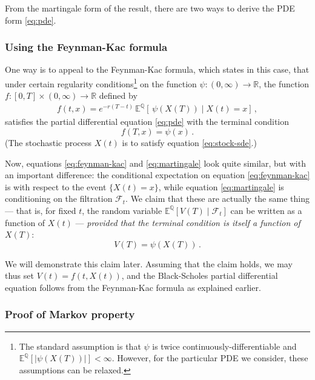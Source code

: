 \documentclass[12pt]{article}
\newcommand{\real}{\mathbb{R}}
\providecommand{\abs}[1]{\lvert#1\rvert}
\newcommand{\sF}{\mathcal{F}}
\newcommand{\EQ}{\mathbb{E}^\mathbb{Q}}
\begin{document}
From the martingale form of the result,
there are two ways to derive the PDE form \eqref{eq:pde}.

\subsubsection{Using the Feynman-Kac formula}

One way is to appeal to the Feynman-Kac formula,
which states in this case, that
under certain regularity conditions\footnote{
The standard assumption is that $\psi$ is twice continuously-differentiable
and $\EQ[ \abs{ \psi(X(T)) } ] < \infty$.
However, for the particular PDE we consider, 
these assumptions can be relaxed.}
on the
function $\psi \colon (0, \infty) \to \real$, the 
function $f \colon [0,T] \times (0, \infty) \to \real$ 
defined by
\begin{align}\label{eq:feynman-kac}
f(t, x) = e^{-r(T-t)} \, \EQ[ \, \psi(X(T)) \mid X(t) = x]\,,
\end{align}
satisfies the partial differential equation \eqref{eq:pde}
with the terminal condition
\[
f(T, x) = \psi(x)\,.
\]
(The stochastic process $X(t)$
is to satisfy equation \eqref{eq:stock-sde}.)

Now, equations \eqref{eq:feynman-kac} and \eqref{eq:martingale}
look quite similar,
but with an important difference:
the conditional expectation on equation \eqref{eq:feynman-kac}
is with respect to the event $\{ X(t) = x\}$,
while equation \eqref{eq:martingale}
is conditioning on the filtration $\sF_t$.
We claim that these are actually the same thing ---
that is, for fixed $t$, the random variable
$\EQ[V(T) \mid \sF_t]$
can be written as a function of $X(t)$ ---
\emph{provided that the terminal condition is itself a function of $X(T)$}:
\[
V(T) = \psi(X(T))\,.
\]

We will demonstrate this claim later.  Assuming that the claim holds,
we may thus set $V(t) = f(t, X(t))$,
and the Black-Scholes partial differential equation follows from
the Feynman-Kac formula as explained earlier.

\subsubsection{Proof of Markov property}
\end{document}
